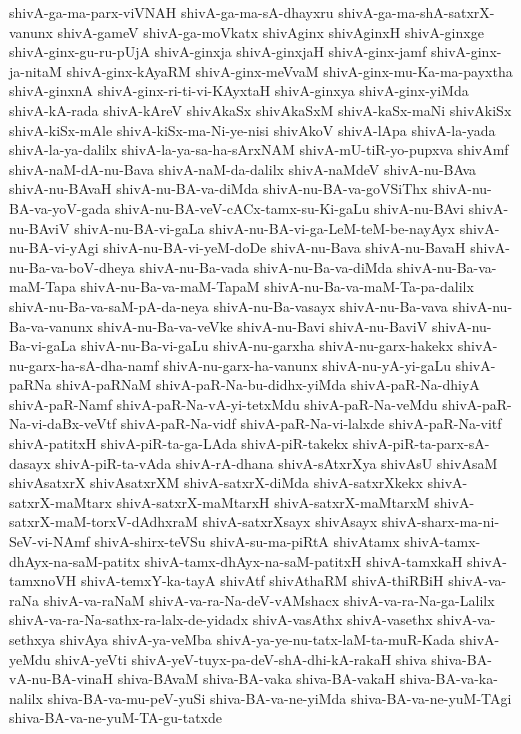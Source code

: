 {shivA-ga-ma-parx-viVNAH
shivA-ga-ma-sA-dhayxru
shivA-ga-ma-shA-satxrX-vanunx
shivA-gameV
shivA-ga-moVkatx
shivAginx
shivAginxH
shivA-ginxge
shivA-ginx-gu-ru-pUjA
shivA-ginxja
shivA-ginxjaH
shivA-ginx-jamf
shivA-ginx-ja-nitaM
shivA-ginx-kAyaRM
shivA-ginx-meVvaM
shivA-ginx-mu-Ka-ma-payxtha
shivA-ginxnA
shivA-ginx-ri-ti-vi-KAyxtaH
shivA-ginxya
shivA-ginx-yiMda
shivA-kA-rada
shivA-kAreV
shivAkaSx
shivAkaSxM
shivA-kaSx-maNi
shivAkiSx
shivA-kiSx-mAle
shivA-kiSx-ma-Ni-ye-nisi
shivAkoV
shivA-lApa
shivA-la-yada
shivA-la-ya-dalilx
shivA-la-ya-sa-ha-sArxNAM
shivA-mU-tiR-yo-pupxva
shivAmf
shivA-naM-dA-nu-Bava
shivA-naM-da-dalilx
shivA-naMdeV
shivA-nu-BAva
shivA-nu-BAvaH
shivA-nu-BA-va-diMda
shivA-nu-BA-va-goVSiThx
shivA-nu-BA-va-yoV-gada
shivA-nu-BA-veV-cACx-tamx-su-Ki-gaLu
shivA-nu-BAvi
shivA-nu-BAviV
shivA-nu-BA-vi-gaLa
shivA-nu-BA-vi-ga-LeM-teM-be-nayAyx
shivA-nu-BA-vi-yAgi
shivA-nu-BA-vi-yeM-doDe
shivA-nu-Bava
shivA-nu-BavaH
shivA-nu-Ba-va-boV-dheya
shivA-nu-Ba-vada
shivA-nu-Ba-va-diMda
shivA-nu-Ba-va-maM-Tapa
shivA-nu-Ba-va-maM-TapaM
shivA-nu-Ba-va-maM-Ta-pa-dalilx
shivA-nu-Ba-va-saM-pA-da-neya
shivA-nu-Ba-vasayx
shivA-nu-Ba-vava
shivA-nu-Ba-va-vanunx
shivA-nu-Ba-va-veVke
shivA-nu-Bavi
shivA-nu-BaviV
shivA-nu-Ba-vi-gaLa
shivA-nu-Ba-vi-gaLu
shivA-nu-garxha
shivA-nu-garx-hakekx
shivA-nu-garx-ha-sA-dha-namf
shivA-nu-garx-ha-vanunx
shivA-nu-yA-yi-gaLu
shivA-paRNa
shivA-paRNaM
shivA-paR-Na-bu-didhx-yiMda
shivA-paR-Na-dhiyA
shivA-paR-Namf
shivA-paR-Na-vA-yi-tetxMdu
shivA-paR-Na-veMdu
shivA-paR-Na-vi-daBx-veVtf
shivA-paR-Na-vidf
shivA-paR-Na-vi-lalxde
shivA-paR-Na-vitf
shivA-patitxH
shivA-piR-ta-ga-LAda
shivA-piR-takekx
shivA-piR-ta-parx-sA-dasayx
shivA-piR-ta-vAda
shivA-rA-dhana
shivA-sAtxrXya
shivAsU
shivAsaM
shivAsatxrX
shivAsatxrXM
shivA-satxrX-diMda
shivA-satxrXkekx
shivA-satxrX-maMtarx
shivA-satxrX-maMtarxH
shivA-satxrX-maMtarxM
shivA-satxrX-maM-torxV-dAdhxraM
shivA-satxrXsayx
shivAsayx
shivA-sharx-ma-ni-SeV-vi-NAmf
shivA-shirx-teVSu
shivA-su-ma-piRtA
shivAtamx
shivA-tamx-dhAyx-na-saM-patitx
shivA-tamx-dhAyx-na-saM-patitxH
shivA-tamxkaH
shivA-tamxnoVH
shivA-temxY-ka-tayA
shivAtf
shivAthaRM
shivA-thiRBiH
shivA-va-raNa
shivA-va-raNaM
shivA-va-ra-Na-deV-vAMshacx
shivA-va-ra-Na-ga-Lalilx
shivA-va-ra-Na-sathx-ra-lalx-de-yidadx
shivA-vasAthx
shivA-vasethx
shivA-va-sethxya
shivAya
shivA-ya-veMba
shivA-ya-ye-nu-tatx-laM-ta-muR-Kada
shivA-yeMdu
shivA-yeVti
shivA-yeV-tuyx-pa-deV-shA-dhi-kA-rakaH
shiva
shiva-BA-vA-nu-BA-vinaH
shiva-BAvaM
shiva-BA-vaka
shiva-BA-vakaH
shiva-BA-va-ka-nalilx
shiva-BA-va-mu-peV-yuSi
shiva-BA-va-ne-yiMda
shiva-BA-va-ne-yuM-TAgi
shiva-BA-va-ne-yuM-TA-gu-tatxde
}
